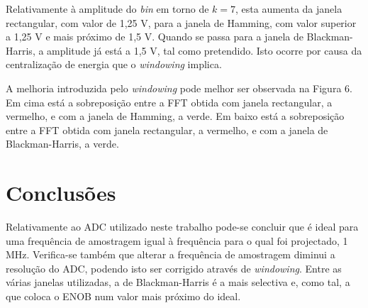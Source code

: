 \documentclass[11pt]{article}
\numberwithin{equation}{section}
\begin{document}
Relativamente à amplitude do \textit{bin} em torno de $k = 7$, esta aumenta da janela rectangular, com valor de 1,25 V, para a janela de Hamming, com valor superior a 1,25 V e mais próximo de 1,5 V. Quando se passa para a janela de Blackman-Harris, a amplitude já está a 1,5 V, tal como pretendido. Isto ocorre por causa da centralização de energia que o \textit{windowing} implica.

A melhoria introduzida pelo \textit{windowing} pode melhor ser observada na Figura 6. Em cima está a sobreposição entre a FFT obtida com janela rectangular, a vermelho, e com a janela de Hamming, a verde. Em baixo está a sobreposição entre a FFT obtida com janela rectangular, a vermelho, e com a janela de Blackman-Harris, a verde.

\section{Conclusões}

Relativamente ao ADC utilizado neste trabalho pode-se concluir que é ideal para uma frequência de amostragem igual à frequência para o qual foi projectado, 1 MHz. Verifica-se também que alterar a frequência de amostragem diminui a resolução do ADC, podendo isto ser corrigido através de \textit{windowing}. Entre as várias janelas utilizadas, a de Blackman-Harris é a mais selectiva e, como tal, a que coloca o ENOB num valor mais próximo do ideal.
	 
\end{document}
